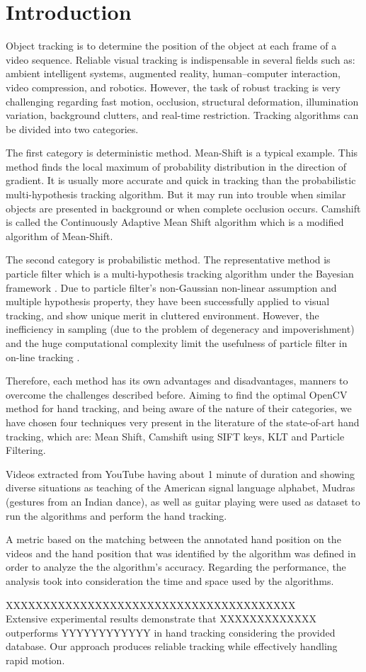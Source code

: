 \documentclass[a4paper]{article}
\begin{document}
\section{Introduction}
Object tracking is to determine the position of the object at each frame of a video sequence. Reliable visual tracking is indispensable in several fields such as: ambient intelligent systems, augmented reality, human–computer interaction, video compression, and robotics. However, the task of robust tracking is very challenging regarding fast motion, occlusion, structural deformation, illumination variation, background clutters, and real-time restriction. Tracking algorithms can be divided into two categories.
\par
The first category is deterministic method. Mean-Shift  is a typical example. This method finds the local maximum of probability distribution in the direction of gradient. It is usually more accurate and quick in tracking than the probabilistic multi-hypothesis tracking algorithm. But it may run into trouble when similar objects are presented in background or when complete occlusion occurs. Camshift is called the Continuously Adaptive Mean Shift algorithm which is a modified algorithm of Mean-Shift.
\par
The second category is probabilistic method. The representative method is particle filter which is a multi-hypothesis tracking algorithm under the Bayesian framework . Due to particle filter’s non-Gaussian non-linear assumption and multiple hypothesis property, they have been successfully applied to visual tracking, and show unique merit in cluttered environment. However, the inefficiency in sampling (due to the problem of degeneracy and impoverishment) and the huge computational complexity limit the usefulness of particle filter in on-line tracking \cite{Yin2011}.
\par
Therefore, each method has its own advantages and disadvantages, manners to overcome the challenges described before. Aiming to find the optimal OpenCV method for hand tracking, and being aware of the nature of their categories, we have chosen four techniques very present in the literature of the state-of-art hand tracking, which are: Mean Shift, Camshift using SIFT keys, KLT and Particle Filtering.
\par
Videos extracted from YouTube having about 1 minute of duration and showing diverse situations as teaching of the American signal language alphabet, Mudras (gestures from an Indian dance), as well as guitar playing  were used as dataset to run the algorithms and perform the hand tracking. 
\par
A metric based on the matching between the annotated hand position on the videos and the hand position that was identified by the algorithm was defined in order to analyze the the algorithm's accuracy. Regarding the performance, the analysis took into consideration the time and space used by the algorithms.
\par
XXXXXXXXXXXXXXXXXXXXXXXXXXXXXXXXXXXXXXX\\
Extensive experimental results demonstrate that XXXXXXXXXXXXX outperforms YYYYYYYYYYYY in hand tracking considering the provided database. Our approach produces reliable tracking while effectively handling rapid motion.
\end{document}
